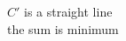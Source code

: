 \documentclass[preview]{standalone}
\begin{document}
\begin{center}
$C'$ is a straight line \\ the sum is minimum
\end{center}
\end{document}
